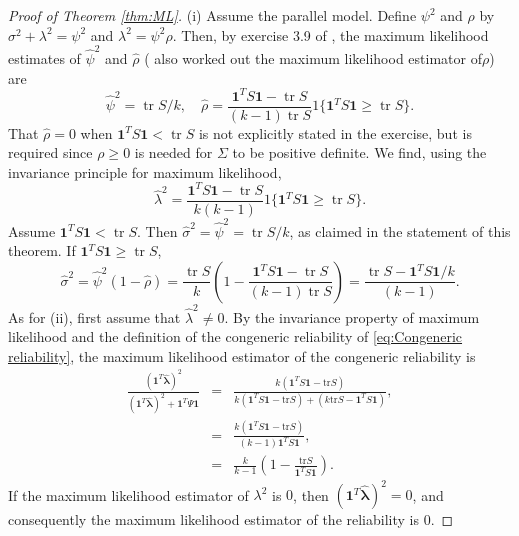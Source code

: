 \documentclass[twoside]{article}
\DeclareMathOperator{\tr}{tr}
\begin{document}
\begin{proof}[Proof of Theorem \ref{thm:ML}]\label{proof:ML}
(i) Assume the parallel model. Define $\psi^{2}$ and $\rho$ by
$\sigma^{2}+\lambda^{2}=\psi^{2}$ and $\lambda^{2}=\psi^{2}\rho$.
Then, by exercise 3.9 of \citet[][p. 114]{Muirhead2009-kq}, the maximum likelihood estimates of $\hat{\psi}^{2}$
and $\hat{\rho}$ (\citet[][Section B]{Kristof1963-tb} also worked out the maximum likelihood estimator of$\rho$) are
\[
\hat{\psi}^{2}=\tr S/k,\quad\hat{\rho}=\frac{\boldsymbol{1}^{T}S\boldsymbol{1}-\tr S}{(k-1)\tr S}1\{\boldsymbol{1}^{T}S\boldsymbol{1}\geq\tr S\}.
\]
That $\hat{\rho}=0$ when $\boldsymbol{1}^{T}S\boldsymbol{1}<\tr S$
is not explicitly stated in the exercise, but is required since $\rho\geq0$
is needed for $\Sigma$ to be positive definite. We find, using the invariance
principle for maximum likelihood,
\[
\hat{\lambda}^{2} = \frac{\boldsymbol{1}^{T}S\boldsymbol{1}-\tr S}{k(k-1)}1\{\boldsymbol{1}^{T}S\boldsymbol{1}\geq\tr S\}.
\]
Assume $\boldsymbol{1}^{T}S\boldsymbol{1}<\tr S$. Then $\hat{\sigma}^{2}=\hat{\psi}^{2}=\tr S/k$,
as claimed in the statement of this theorem. If $\boldsymbol{1}^{T}S\boldsymbol{1}\geq\tr S$,
\begin{equation*}
\hat{\sigma}^{2} = \hat{\psi}^{2}(1-\hat{\rho})
 = \frac{\tr S}{k}\left(1-\frac{\boldsymbol{1}^{T}S\boldsymbol{1}-\tr S}{(k-1)\tr S}\right)
 = \frac{\tr S-\boldsymbol{1}^{T}S\boldsymbol{1}/k}{(k-1)}.
\end{equation*}
As for (ii), first assume that $\hat{\lambda}^2\neq 0$. By the invariance property of maximum likelihood and the definition of the congeneric reliability of \cref{eq:Congeneric reliability}, the maximum likelihood estimator of the congeneric reliability is
\begin{eqnarray*}
\frac{(\boldsymbol{1}^{T}\mathbf{\hat{\lambda}})^{2}}{(\boldsymbol{1}^{T}\mathbf{\hat{\lambda}})^{2}+\boldsymbol{1}^{T}\Psi\boldsymbol{1}} & = & \frac{k(\boldsymbol{1}^{T}S\boldsymbol{1}-\textrm{tr}S)}{k(\boldsymbol{1}^{T}S\boldsymbol{1}-\textrm{tr}S)+(k\textrm{tr}S-\boldsymbol{1}^{T}S\boldsymbol{1})},\\
 & = & \frac{k(\boldsymbol{1}^{T}S\boldsymbol{1}-\textrm{tr}S)}{(k-1)\boldsymbol{1}^{T}S\boldsymbol{1}},\\
 & = & \frac{k}{k-1}\left(1-\frac{\textrm{tr}S}{\boldsymbol{1}^{T}S\boldsymbol{1}}\right).
\end{eqnarray*}
If the maximum likelihood estimator of $\lambda^{2}$ is $0$, then $(\boldsymbol{1}^{T}\mathbf{\hat{\lambda}})^{2}=0$,
and consequently the maximum likelihood estimator of the reliability is $0.$
\end{proof}
\end{document}
